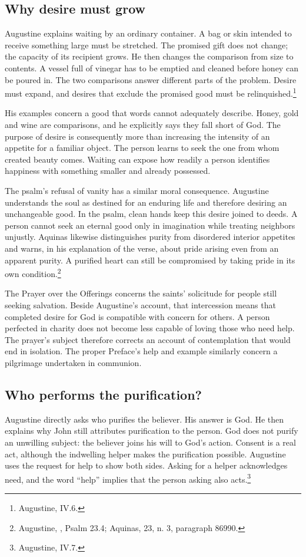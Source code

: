 \subsection{Why desire must grow}
Augustine explains waiting by an ordinary container. A bag or skin intended to receive something large must be stretched. The promised gift does not change; the capacity of its recipient grows. He then changes the comparison from size to contents. A vessel full of vinegar has to be emptied and cleaned before honey can be poured in. The two comparisons answer different parts of the problem. Desire must expand, and desires that exclude the promised good must be relinquished.\footnote{Augustine,  IV.6.}

His examples concern a good that words cannot adequately describe. Honey, gold and wine are comparisons, and he explicitly says they fall short of God. The purpose of desire is consequently more than increasing the intensity of an appetite for a familiar object. The person learns to seek the one from whom created beauty comes. Waiting can expose how readily a person identifies happiness with something smaller and already possessed.

The psalm's refusal of vanity has a similar moral consequence. Augustine understands the soul as destined for an enduring life and therefore desiring an unchangeable good. In the psalm, clean hands keep this desire joined to deeds. A person cannot seek an eternal good only in imagination while treating neighbors unjustly. Aquinas likewise distinguishes purity from disordered interior appetites and warns, in his explanation of the verse, about pride arising even from an apparent purity. A purified heart can still be compromised by taking pride in its own condition.\footnote{Augustine, , Psalm 23.4; Aquinas,  23, n. 3, paragraph 86990.}

The Prayer over the Offerings concerns the saints' solicitude for people still seeking salvation. Beside Augustine's account, that intercession means that completed desire for God is compatible with concern for others. A person perfected in charity does not become less capable of loving those who need help. The prayer's subject therefore corrects an account of contemplation that would end in isolation. The proper Preface's help and example similarly concern a pilgrimage undertaken in communion.

\subsection{Who performs the purification?}
Augustine directly asks who purifies the believer. His answer is God. He then explains why John still attributes purification to the person. God does not purify an unwilling subject: the believer joins his will to God's action. Consent is a real act, although the indwelling helper makes the purification possible. Augustine uses the request for help to show both sides. Asking for a helper acknowledges need, and the word ``help'' implies that the person asking also acts.\footnote{Augustine,  IV.7.}

